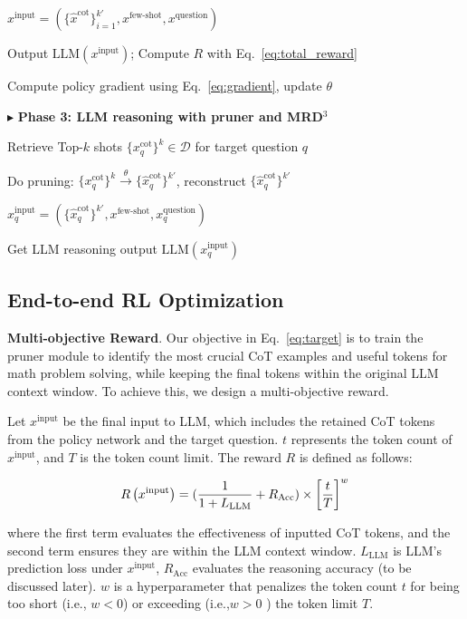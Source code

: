 \begin{algorithm}[t]
\begin{algorithmic}[1]
		\STATE  $x^{\text{input}} = \left(\{\hat x^{\text{cot}}\}^{k'}_{i=1}, x^{\text{few-shot}}, x^{\text{question}}\right)$

		\STATE Output ${\text{LLM}}({x}^{\text{input}})$; Compute $R$ with Eq.~\ref{eq:total_reward}

		\ENDFOR

		\STATE Compute policy gradient using Eq.~\ref{eq:gradient}, update $\theta$ 
		\ENDFOR 

		\STATE $\blacktriangleright$ \textbf{Phase 3: LLM reasoning with pruner and MRD$^3$}

		\STATE Retrieve Top-$k$ shots $\{x^{\text{cot}}_{q}\}^k\in\mathcal{D}$ for  target question $q$

		\STATE Do pruning: $\{x^{\text{cot}}_{ q}\}^k\xrightarrow{\theta}\{\hat x^{\text{cot}}_{ q}\}^{k'}$, reconstruct $\{\hat x^{\text{cot}}_{q}\}^{k'}$ 

		\STATE $x^{\text{input}}_{q} = \left(\{\hat x^{\text{cot}}_{q}\}^{k'}, x^{\text{few-shot}}, x^\text{question}_q\right)$

		\STATE Get LLM reasoning output $ {\text{LLM}}({x}^{\text{input}}_{ q})$

	\end{algorithmic}
\end{algorithm}

\subsection{End-to-end RL Optimization}
\label{sec:training}
\textbf{Multi-objective Reward}. Our objective in Eq.~\ref{eq:target} is to train the pruner module to identify the most crucial CoT examples and useful tokens for math problem solving, while keeping the final tokens within the original LLM context window. To achieve this, we design a multi-objective reward.

Let $x^\text{input}$ be the final input to  LLM, which includes the retained CoT tokens from the policy network and the target question. $t$ represents the token count of $x^\text{input}$, and $T$ is the token count limit. The reward $R$ is defined as follows:

\begin{equation} \label{eq:total_reward}
	\small
	\displaystyle	R\left( x^\text{input}\right) = (\frac{1}{1+L_\text{LLM}}+R_{\text{Acc}}) \times \left[\frac{t}{T}\right]^w
\end{equation}

where the first term evaluates the effectiveness of inputted CoT tokens, and the second term ensures they are within the LLM context window. $L_\text{LLM}$ is LLM's prediction loss under $x^\text{input}$, $R_\text{Acc}$ evaluates the reasoning accuracy (to be discussed later). $w$ is a hyperparameter that penalizes the token count $t$ for being too short (i.e., $w<0$) or exceeding (i.e.,$w>0$ ) the token limit $T$. 

